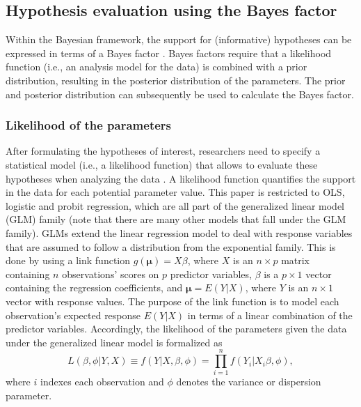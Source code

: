 \documentclass[review, 3p, authoryear]{elsarticle} %
\begin{document}
\hypertarget{hypothesis-evaluation-using-the-bayes-factor}{%
\subsection{Hypothesis evaluation using the Bayes factor}\label{hypothesis-evaluation-using-the-bayes-factor}}

Within the Bayesian framework, the support for (informative) hypotheses can be expressed in terms of a Bayes factor \citep{kass_raftery_bayes_factors_1995}.
Bayes factors require that a likelihood function (i.e., an analysis model for the data) is combined with a prior distribution, resulting in the posterior distribution of the parameters.
The prior and posterior distribution can subsequently be used to calculate the Bayes factor.

\hypertarget{likelihood-of-the-parameters}{%
\subsubsection{Likelihood of the parameters}\label{likelihood-of-the-parameters}}

After formulating the hypotheses of interest, researchers need to specify a statistical model (i.e., a likelihood function) that allows to evaluate these hypotheses when analyzing the data \citep{lynch_introduction_2007}.
A likelihood function quantifies the support in the data for each potential parameter value.
This paper is restricted to OLS, logistic and probit regression, which are all part of the generalized linear model (GLM) family (note that there are many other models that fall under the GLM family).
GLMs extend the linear regression model to deal with response variables that are assumed to follow a distribution from the exponential family.
This is done by using a link function \(g(\boldsymbol{\mu}) = X\beta\), where \(X\) is an \(n \times p\) matrix containing \(n\) observations' scores on \(p\) predictor variables, \(\beta\) is a \(p \times 1\) vector containing the regression coefficients, and \(\boldsymbol{\mu} = E(Y|X)\), where \(Y\) is an \(n \times 1\) vector with response values.
The purpose of the link function is to model each observation's expected response \(E(Y|X)\) in terms of a linear combination of the predictor variables.
Accordingly, the likelihood of the parameters given the data under the generalized linear model is formalized as
\[
L(\beta, \phi|Y, X) \equiv f(Y|X, \beta, \phi) = \prod^n_{i=1} f(Y_i|X_i \beta, \phi),
\]
where \(i\) indexes each observation and \(\phi\) denotes the variance or dispersion parameter.
\end{document}
